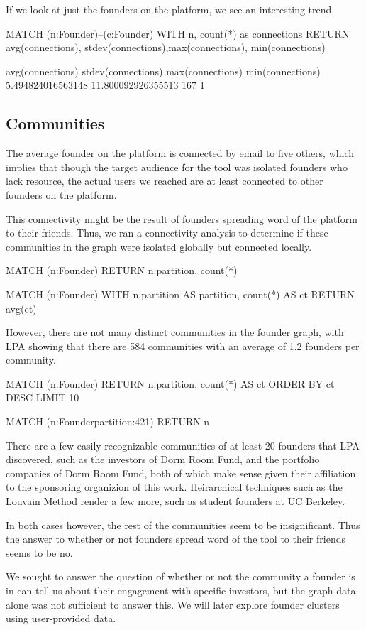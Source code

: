 If we look at just the founders on the platform, we see an interesting trend.

MATCH (n:Founder)--(c:Founder)
WITH n, count(*) as connections
RETURN avg(connections), stdev(connections),max(connections), min(connections)

avg(connections)  stdev(connections)  max(connections)  min(connections)
5.494824016563148 11.800092926355513  167 1

\subsection{Communities}

The average founder on the platform is connected by email to five others, which implies that though the target audience for the tool was isolated founders who lack resource, the actual users we reached are at least connected to other founders on the platform.

This connectivity might be the result of founders spreading word of the platform to their friends. Thus, we ran a connectivity analysis to determine if these communities in the graph were isolated globally but connected locally.

MATCH (n:Founder)
RETURN n.partition, count(*)

MATCH (n:Founder)
WITH n.partition AS partition, count(*) AS ct
RETURN avg(ct)

However, there are not many distinct communities in the founder graph, with LPA \cite{2007PhRvE..76c6106R} showing that there are 584 communities with an average of 1.2 founders per community.

MATCH (n:Founder)
RETURN n.partition, count(*) AS ct
ORDER BY ct DESC
LIMIT 10

MATCH (n:Founder{partition:421})
RETURN n

There are a few easily-recognizable communities of at least 20 founders that LPA discovered, such as the investors of Dorm Room Fund, and the portfolio companies of Dorm Room Fund, both of which make sense given their affiliation to the sponsoring organizion of this work. Heirarchical techniques such as the Louvain Method render a few more, such as student founders at UC Berkeley.

In both cases however, the rest of the communities seem to be insignificant. Thus the answer to whether or not founders spread word of the tool to their friends seems to be no.

We sought to answer the question of whether or not the community a founder is in can tell us about their engagement with specific investors, but the graph data alone was not sufficient to answer this. We will later explore founder clusters using user-provided data.

